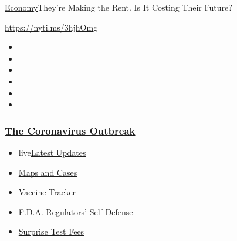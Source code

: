 \href{/section/business/economy}{Economy}\textbar{}They're Making the
Rent. Is It Costing Their Future?

\url{https://nyti.ms/3hjhOmg}

\begin{itemize}
\item
\item
\item
\item
\item
\item
\end{itemize}

\hypertarget{the-coronavirus-outbreak}{%
\subsubsection{\texorpdfstring{\href{https://www.nytimes3xbfgragh.onion/news-event/coronavirus?name=styln-coronavirus-markets\&region=TOP_BANNER\&block=storyline_menu_recirc\&action=click\&pgtype=Article\&impression_id=f8ec5c60-f52b-11ea-bcaf-0f2585cccc67\&variant=undefined}{The
Coronavirus
Outbreak}}{The Coronavirus Outbreak}}\label{the-coronavirus-outbreak}}

\begin{itemize}
\tightlist
\item
  live\href{https://www.nytimes3xbfgragh.onion/2020/09/12/world/covid-19-coronavirus.html?name=styln-coronavirus-markets\&region=TOP_BANNER\&block=storyline_menu_recirc\&action=click\&pgtype=Article\&impression_id=f8ec8370-f52b-11ea-bcaf-0f2585cccc67\&variant=undefined}{Latest
  Updates}
\item
  \href{https://www.nytimes3xbfgragh.onion/interactive/2020/us/coronavirus-us-cases.html?name=styln-coronavirus-markets\&region=TOP_BANNER\&block=storyline_menu_recirc\&action=click\&pgtype=Article\&impression_id=f8ec8371-f52b-11ea-bcaf-0f2585cccc67\&variant=undefined}{Maps
  and Cases}
\item
  \href{https://www.nytimes3xbfgragh.onion/interactive/2020/science/coronavirus-vaccine-tracker.html?name=styln-coronavirus-markets\&region=TOP_BANNER\&block=storyline_menu_recirc\&action=click\&pgtype=Article\&impression_id=f8ec8372-f52b-11ea-bcaf-0f2585cccc67\&variant=undefined}{Vaccine
  Tracker}
\item
  \href{https://www.nytimes3xbfgragh.onion/2020/09/10/us/politics/fda-coronavirus-vaccine.html?name=styln-coronavirus-markets\&region=TOP_BANNER\&block=storyline_menu_recirc\&action=click\&pgtype=Article\&impression_id=f8ec8373-f52b-11ea-bcaf-0f2585cccc67\&variant=undefined}{F.D.A.
  Regulators' Self-Defense}
\item
  \href{https://www.nytimes3xbfgragh.onion/2020/09/09/upshot/coronavirus-surprise-test-fees.html?name=styln-coronavirus-markets\&region=TOP_BANNER\&block=storyline_menu_recirc\&action=click\&pgtype=Article\&impression_id=f8ec8374-f52b-11ea-bcaf-0f2585cccc67\&variant=undefined}{Surprise
  Test Fees}
\end{itemize}

